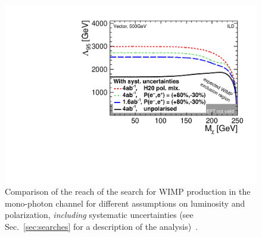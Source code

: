 \begin{itemize}
\begin{figure}
\centering
\includegraphics[width=0.95\linewidth]{./chapters/figures/vector_withSystematics.pdf}
		
\caption{Comparison of the reach of the search for WIMP production in the mono-photon channel for different assumptions on luminosity and polarization, {\em including} systematic uncertainties (see Sec.~\ref{sec:searches} for a description of the analysis)~\cite{Habermehl:417605}. }
\label{fig:polWIMPsys}
\end{figure}

\end{itemize}

